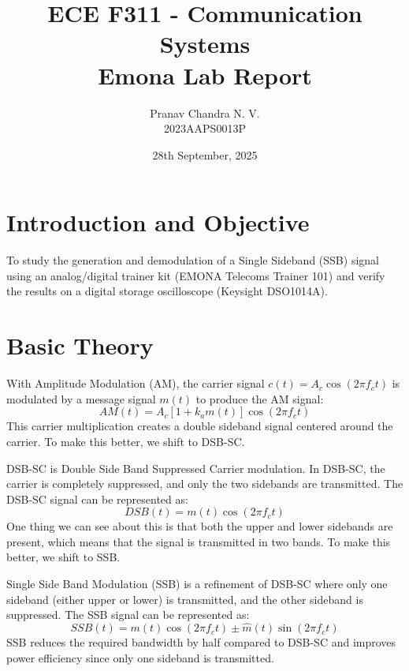 \documentclass[12pt, a4paper]{AnantDocumentation}
\title{ECE F311 - Communication Systems \\ Emona Lab Report}
\author{Pranav Chandra N. V. \\ 2023AAPS0013P}
\date{28th September, 2025}
\begin{document}
\maketitle

\section{Introduction and Objective}
To study the generation and demodulation of a Single Sideband (SSB) signal using an analog/digital trainer kit (EMONA Telecoms Trainer 101) and verify the results on a digital storage oscilloscope (Keysight DSO1014A).

\section{Basic Theory}
With Amplitude Modulation (AM), the carrier signal $c(t) = A_c \cos(2\pi f_c t)$ is modulated by a message signal $m(t)$ to produce the AM signal:
\begin{equation}
	AM(t) = A_c \left[1 + k_a m(t)\right] \cos(2\pi f_c t)
\end{equation}
This carrier multiplication creates a double sideband signal centered around the carrier. To make this better, we shift to DSB-SC.

DSB-SC is Double Side Band Suppressed Carrier modulation. In DSB-SC, the carrier is completely suppressed, and only the two sidebands are transmitted. The DSB-SC signal can be represented as:
\begin{equation}
	DSB(t) = m(t) \cos(2\pi f_c t)
\end{equation}
One thing we can see about this is that both the upper and lower sidebands are present, which means that the signal is transmitted in two bands. To make this better, we shift to SSB.

Single Side Band Modulation (SSB) is a refinement of DSB-SC where only one sideband (either upper or lower) is transmitted, and the other sideband is suppressed. The SSB signal can be represented as:
\begin{equation}
	SSB(t) = m(t) \cos(2\pi f_c t) \pm \hat{m}(t) \sin(2\pi f_c t)
\end{equation}
SSB reduces the required bandwidth by half compared to DSB-SC and improves power efficiency since only one sideband is transmitted.
\end{document}
